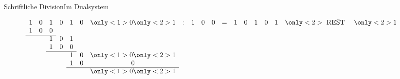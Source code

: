 \documentclass[xelatex,aspectratio=169]{beamer}
\begin{document}
\begin{frame}{Schriftliche Division}{Im Dualsystem}
  \vspace{-\baselineskip}
  \begin{block}{}
    \small
    \[
      \begin{array}{ccccccccccccccccccc}
        1 & 0 & 1 & 0 & 1 & 0 & \only<1>{0}\only<2>{1} & : & 1 & 0 & 0 & = & 1 & 0 & 1 & 0 & 1 & \only<2>{\mbox{ REST }} & \only<2>{1} \\
        1 & 0 & 0 &   &   &   &                                                                                                        \\
        \cline{1-3}
          &   & 1 & 0 & 1                                                                                                              \\
          &   & 1 & 0 & 0                                                                                                              \\
        \cline{3-5}
          &   &   &   & 1 & 0 & \only<1>{0}\only<2>{1}                                                                                 \\
          &   &   &   & 1 & 0 & 0                                                                                                      \\
        \cline{5-7}
          &   &   &   &   &   & \only<1>{0}\only<2>{1}                                                                                 \\
      \end{array}
    \]
  \end{block}


\end{frame}
\end{document}
